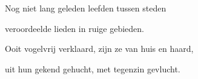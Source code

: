 Nog niet lang geleden
leefden tussen steden

veroordeelde lieden
in ruige gebieden.

Ooit vogelvrij verklaard,
zijn ze van huis en haard,

uit hun gekend gehucht,
met tegenzin gevlucht.
